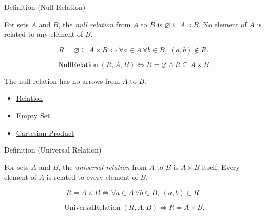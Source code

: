 \begin{definitionbox}{Definition (Null Relation)}
\begin{definition}\label{def:null-relation}
For sets $A$ and $B$, the \emph{null relation} from $A$ to $B$ is
$\varnothing\subseteq A\times B$. No element of $A$ is related to any element
of $B$.
\end{definition}
\end{definitionbox}

\begin{remark*}
\[
  R=\varnothing \subseteq A\times B
  \iff
  \forall a\in A\,\forall b\in B,\ (a,b)\notin R.
\]
\end{remark*}

\begin{remark*}
\[
  \operatorname{NullRelation}(R,A,B)
  \iff
  R=\varnothing \wedge R\subseteq A\times B.
\]
\end{remark*}

\begin{remark*}[Interpretation]
The null relation has no arrows from $A$ to $B$.
\end{remark*}

\begin{dependencies}
\begin{itemize}
  \item \hyperref[def:relation]{Relation}
  \item \hyperref[def:empty-set]{Empty Set}
  \item \hyperref[def:cartesian-product-rel]{Cartesian Product}
\end{itemize}
\end{dependencies}

\begin{definitionbox}{Definition (Universal Relation)}
\begin{definition}\label{def:universal-relation}
For sets $A$ and $B$, the \emph{universal relation} from $A$ to $B$ is
$A\times B$ itself. Every element of $A$ is related to every element of $B$.
\end{definition}
\end{definitionbox}

\begin{remark*}
\[
  R=A\times B
  \iff
  \forall a\in A\,\forall b\in B,\ (a,b)\in R.
\]
\end{remark*}

\begin{remark*}
\[
  \operatorname{UniversalRelation}(R,A,B)
  \iff
  R=A\times B.
\]
\end{remark*}

